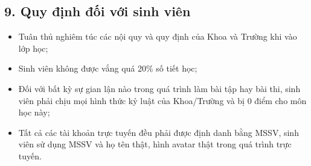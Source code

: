 \subsection*{9. Quy định đối với sinh viên}
\begin{itemize}
    \item Tuân thủ nghiêm túc các nội quy và quy định của Khoa và Trường khi vào lớp học;
    \item Sinh viên không được vắng quá 20\% số tiết học;
    \item Đối với bất kỳ sự gian lận nào trong quá trình làm bài tập hay bài thi, sinh viên phải chịu mọi hình thức kỷ luật của Khoa/Trường và bị 0 điểm cho môn học này;
    \item Tất cả các tài khoản trực tuyến đều phải được định danh bằng MSSV, sinh viên sử dụng MSSV và họ tên thật, hình avatar thật trong quá trình trực tuyến.
\end{itemize}
